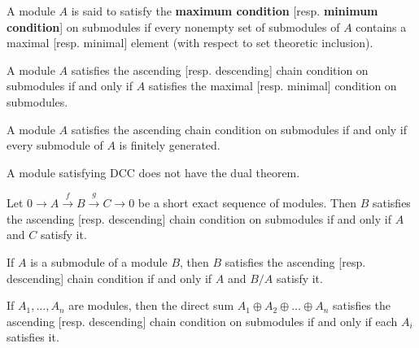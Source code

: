 \documentclass{article}
\begin{document}
\begin{definition}
    A module $A$ is said to satisfy the \textbf{maximum condition} [resp. \textbf{minimum condition}] on submodules if every nonempty set of submodules of $A$ contains a maximal [resp. minimal] element (with respect to set theoretic inclusion).
\end{definition}

\begin{theorem}
    A module $A$ satisfies the ascending [resp. descending] chain condition on submodules if and only if $A$ satisfies the maximal [resp. minimal] condition on submodules.
\end{theorem}

\begin{theorem}
    A module $A$ satisfies the ascending chain condition on submodules if and only if every submodule of $A$ is finitely generated.
\end{theorem}
\begin{remark}
    A module satisfying DCC does not have the dual theorem.
\end{remark}

\begin{theorem}
    Let $0 \to A \xrightarrow{f} B \xrightarrow{g} C \to 0$ be a short exact sequence of modules. Then $B$ satisfies the ascending [resp. descending] chain condition on submodules if and only if $A$ and $C$ satisfy it.
\end{theorem}

\begin{corollary}
    If $A$ is a submodule of a module $B$, then $B$ satisfies the ascending [resp. descending] chain condition if and only if $A$ and $B/A$ satisfy it.
\end{corollary}

\begin{corollary}
    If $A_1, \dots, A_n$ are modules, then the direct sum $A_1 \oplus A_2 \oplus \dots \oplus A_n$ satisfies the ascending [resp. descending] chain condition on submodules if and only if each $A_i$ satisfies it.
\end{corollary}
\end{document}
